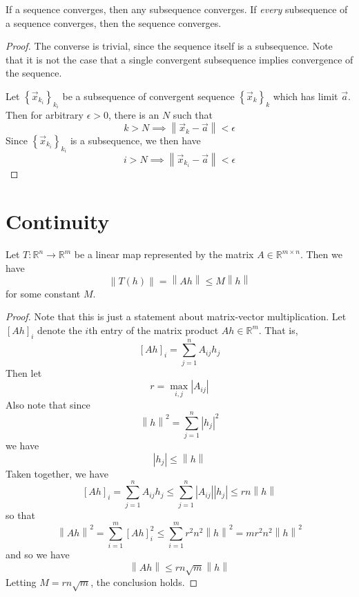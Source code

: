 \begin{prop}
If a sequence converges, then any subsequence converges. If \textit{every} subsequence of a sequence converges, then the sequence converges.
\end{prop}
\begin{proof}
The converse is trivial, since the sequence itself is a subsequence. Note that it is not the case that a single convergent subsequence implies convergence of the sequence.

Let $\left\{ \vec{x}_{k_i} \right\}_{k_i}$ be a subsequence of convergent sequence $\left\{ \vec{x}_k\right\}_{k}$ which has limit $\vec{a}$. Then for arbitrary $\epsilon >0$, there is an $N$ such that \[ k > N \implies \left\lVert \vec{x}_k -\vec{a} \right\rVert < \epsilon \] Since $\left\{ \vec{x}_{k_i} \right\}_{k_i}$ is a subsequence, we then have \[ i > N \implies \left\lVert \vec{x}_{k_i} -\vec{a} \right\rVert < \epsilon \]

\end{proof}










\chapter{Continuity}



\begin{prop}
Let $T: \mathbb{R}^n \rightarrow \mathbb{R}^m$ be a linear map represented by the matrix $A \in \mathbb{R}^{m \times n}$. Then we have \[ \left\lVert T\left(h\right) \right\rVert = \left\lVert Ah \right\rVert  \leq M \left\lVert h \right\rVert \] for some constant $M$.
\end{prop}
\begin{proof}
Note that this is just a statement about matrix-vector multiplication. Let $\left[ Ah \right]_i$ denote the $i$th entry of the matrix product $Ah \in \mathbb{R}^m$. That is, \[ \left[Ah\right]_i = \sum_{j=1}^n A_{ij}h_j \] Then let \[ r = \max_{i,j} \left| A_{ij} \right| \] Also note that since \[ \left\lVert h \right\rVert^2 = \sum_{j=1}^n \left| h_j \right|^2 \] we have \[ \left| h_j \right| \leq \left\lVert h \right\rVert \] Taken together, we have \[ \left[ Ah\right]_i = \sum_{j=1}^n A_{ij} h_j \leq \sum_{j=1}^n \left| A_{ij} \right| \left| h_j \right| \leq rn\left\lVert h \right\rVert \] so that \[ \left\lVert Ah\right\rVert^2 = \sum_{i=1}^m \left[Ah\right]_i^2 \leq \sum_{i=1}^m r^2n^2 \left\lVert h\right\rVert^2 = mr^2n^2 \left\lVert h\right\rVert^2 \] and so we have \[ \left\lVert Ah\right\rVert \leq rn\sqrt{m}\left\lVert h \right\rVert \] Letting $M = rn\sqrt{m}$, the conclusion holds.
\end{proof}


